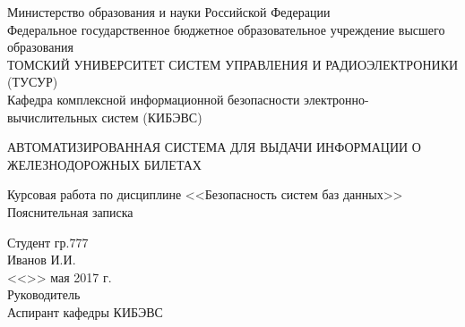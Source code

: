 \begin{titlepage}
    \newpage
    
    \begin{center}
        Министерство образования и науки Российской
        Федерации\\
        \vspace{1em}
        Федеральное государственное бюджетное образовательное учреждение высшего образования\\
        \vspace{1em}
        \MakeTextUppercase{Томский Университет Систем Управления и
        Радиоэлектроники (ТУСУР)}\\
        \vspace{1em}
        Кафедра комплексной информационной безопасности
        электронно-вычислительных систем (КИБЭВС)
    \end{center}

    \vspace{8em}

    \begin{center}
        \MakeTextUppercase{Автоматизированная система для выдачи информации о железнодорожных билетах}
        
        \vspace{1em}
        Курсовая работа по дисциплине <<Безопасность систем баз данных>>\\
        
        Пояснительная записка \\
        
    \end{center}

    \vspace{3em}

    \begin{flushright}
        \begin{minipage}[t]{0.4\textwidth}
            \begin{flushleft}
                Студент гр.777\\
                \underline{\phantom{aaaaaaaaaaaaaaa}} Иванов И.И.\\
                <<\underline{\phantom{aaaa}}>> мая 2017 г.\\
                \vspace{2em}
                Руководитель\\
                Аспирант кафедры КИБЭВС\\
            \end{flushleft}
        \end{minipage}
    \end{flushright}


\end{titlepage}
